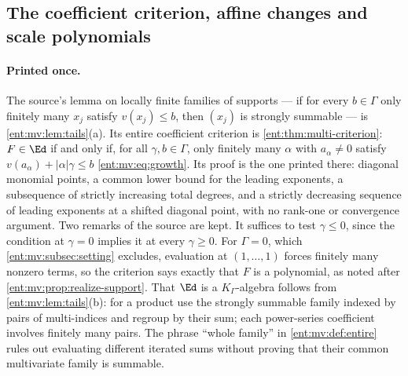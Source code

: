 \documentclass[11pt]{article}
\theoremstyle{plain}
\theoremstyle{plain}
\theoremstyle{plain}
\theoremstyle{definition}
\theoremstyle{definition}
\theoremstyle{definition}
\theoremstyle{definition}
\theoremstyle{remark}
\newcommand{\K}{K_\Gamma}\newcommand{\KD}{K_\Delta}
\begin{document}
\subsection{The coefficient criterion, affine changes and scale polynomials}
\label{ent:as:subsec:scales}

\paragraph{Printed once.} The source's lemma on locally finite families of
supports --- if for every $b\in\Gamma$ only finitely many $x_j$ satisfy
$v(x_j)\le b$, then $(x_j)$ is strongly summable --- is
\cref{ent:mv:lem:tails}(a). Its entire coefficient criterion is
\cref{ent:thm:multi-criterion}: $F\in\Ed$ if and only if, for all
$\gamma,b\in\Gamma$, only finitely many $\alpha$ with $a_\alpha\ne0$ satisfy
$v(a_\alpha)+|\alpha|\gamma\le b$ \eqref{ent:mv:eq:growth}. Its proof is the
one printed there: diagonal monomial points, a common lower bound for the
leading exponents, a subsequence of strictly increasing total degrees, and a
strictly decreasing sequence of leading exponents at a shifted diagonal point,
with no rank-one or convergence argument. Two remarks of the source are kept.
It suffices to test $\gamma\le0$, since the condition at $\gamma=0$ implies it
at every $\gamma\ge0$. For $\Gamma=0$, which \cref{ent:mv:subsec:setting}
excludes, evaluation at $(1,\ldots,1)$ forces finitely many nonzero terms, so
the criterion says exactly that $F$ is a polynomial, as noted after
\cref{ent:mv:prop:realize-support}. That $\Ed$ is a $\K$-algebra follows from
\cref{ent:mv:lem:tails}(b): for a product use the strongly summable family
indexed by pairs of multi-indices and regroup by their sum; each power-series
coefficient involves finitely many pairs. The phrase ``whole family'' in
\cref{ent:mv:def:entire} rules out evaluating different iterated sums without
proving that their common multivariate family is summable.
\end{document}
